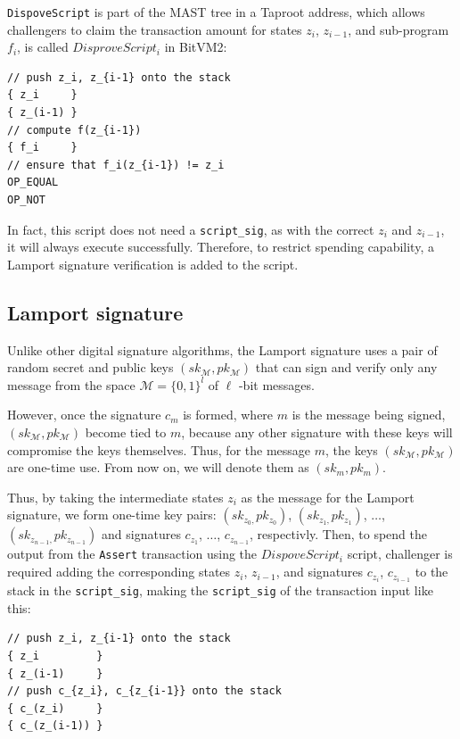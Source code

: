 \documentclass[11pt]{article}
\begin{document}
\texttt{DispoveScript} is part of the MAST tree in a Taproot address,
which allows challengers to claim the transaction amount for states
\(z_i\), \(z_{i-1}\), and sub-program \(f_i\), is called
\(DisproveScript_i\) in BitVM2:

\begin{verbatim}
// push z_i, z_{i-1} onto the stack
{ z_i     }
{ z_(i-1) }
// compute f(z_{i-1})
{ f_i     }
// ensure that f_i(z_{i-1}) != z_i
OP_EQUAL
OP_NOT
\end{verbatim}

In fact, this script does not need a \texttt{script\_sig}, as with the
correct \(z_i\) and \(z_{i-1}\), it will always execute
successfully. Therefore, to restrict spending capability, a Lamport
signature verification is added to the script.

\subsection{Lamport signature}\label{sec:lamport-signature}

Unlike other digital signature algorithms, the Lamport signature uses
a pair of random secret and public keys \((sk_{\mathcal{M}},
pk_{\mathcal{M}})\) that can sign and verify only any message from the
space \(\mathcal{M} = {\{0, 1\}}^{l}\) of \(\ell\) -bit messages.

However, once the signature \(c_{m}\) is formed, where \(m\) is the message
being signed, \((sk_{\mathcal{M}}, pk_{\mathcal{M}})\) become tied to \(m\),
because any other signature with these keys will compromise the keys
themselves. Thus, for the message \(m\), the keys \((sk_{\mathcal{M}},
pk_{\mathcal{M}})\) are one-time use. From now on, we will denote them as
\((sk_{m}, pk_m)\).

Thus, by taking the intermediate states \(z_i\) as the message for the
Lamport signature, we form one-time key pairs: \((sk_{z_0,
}pk_{z_0})\), \((sk_{z_1, }pk_{z_1})\), \(\ldots\), \((sk_{z_{n-1},
}pk_{z_{n-1}})\) and signatures \(c_{z_1}\), \(\ldots\),
\(c_{z_{n-1}}\), respectivly. Then, to spend the output from the
\texttt{Assert} transaction using the \(DispoveScript_i\) script,
challenger is required adding the corresponding states \(z_i\),
\(z_{i-1}\), and signatures \(c_{z_{i}}\), \(c_{z_{i-1}}\) to the
stack in the \texttt{script\_sig}, making the \texttt{script\_sig} of
the transaction input like this:

\begin{verbatim}
// push z_i, z_{i-1} onto the stack
{ z_i         }
{ z_(i-1)     }
// push c_{z_i}, c_{z_{i-1}} onto the stack
{ c_(z_i)     }
{ c_(z_(i-1)) }
\end{verbatim}
\end{document}
